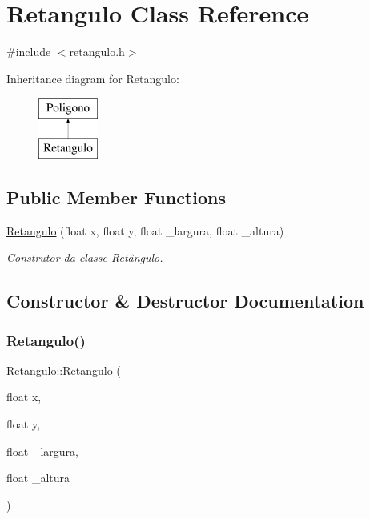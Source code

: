 \hypertarget{class_retangulo}{}\section{Retangulo Class Reference}
\label{class_retangulo}


{\ttfamily \#include $<$retangulo.\+h$>$}

Inheritance diagram for Retangulo\+:\begin{figure}[H]
\begin{center}
\leavevmode
\includegraphics[height=2.000000cm]{class_retangulo}
\end{center}
\end{figure}
\subsection*{Public Member Functions}
\begin{DoxyCompactItemize}
\item 
\mbox{\hyperlink{class_retangulo_a54988c3e6af9f464d751940e32941d88}{Retangulo}} (float x, float y, float \+\_\+largura, float \+\_\+altura)
\begin{DoxyCompactList}\small\item\em Construtor da classe Retângulo. \end{DoxyCompactList}\end{DoxyCompactItemize}


\subsection{Constructor \& Destructor Documentation}
\mbox{\label{class_retangulo_a54988c3e6af9f464d751940e32941d88}} 
\subsubsection{\texorpdfstring{Retangulo()}{Retangulo()}}
{\footnotesize\ttfamily Retangulo\+::\+Retangulo (\begin{DoxyParamCaption}\item[{float}]{x,  }\item[{float}]{y,  }\item[{float}]{\+\_\+largura,  }\item[{float}]{\+\_\+altura }\end{DoxyParamCaption})}



